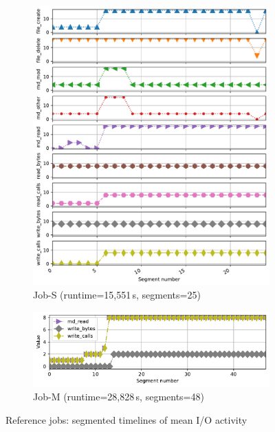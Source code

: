 \documentclass{jhps}
\begin{document}
\begin{figure}
\begin{subfigure}{0.8\textwidth}
\centering
\includegraphics[width=\textwidth]{job-timeseries4296426}
\caption{Job-S (runtime=15,551\,s, segments=25)}\label{fig:job-S}
\end{subfigure}
\centering


\begin{subfigure}{0.8\textwidth}
\centering
\includegraphics[width=\textwidth]{job-timeseries5024292}
\caption{Job-M (runtime=28,828\,s, segments=48)}\label{fig:job-M}
\end{subfigure}
\centering


\caption{Reference jobs: segmented timelines of mean I/O activity}%
\label{fig:refJobs}
\end{figure}
\end{document}
